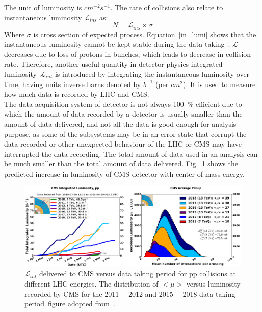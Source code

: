 The unit of luminosity is $cm^{-2}s^{-1}$. The rate of collisions also relate to instantaneous luminosity $\mathcal{L}_{ins}$ as:
\begin{equation}\label{in_lumi}
N=\mathcal{L}_{ins}\times\sigma
\end{equation}
Where $\sigma$ is cross section of expected process. Equation~\ref{in_lumi} shows that the instantaneous luminosity cannot be kept stable during the data taking~\cite{Waqas:2779481}. $\mathcal{L}$ decreases due to loss of protons in bunches, which leads to decrease in collision rate. Therefore, another useful quantity in detector physics integrated luminosity~$\mathcal{L}_{int}$ is introduced by integrating the instantaneous luminosity over time, having units inverse barns denoted by $b^{-1}$ (per $cm^{2}$). It is used to measure how much data is recorded by LHC and CMS.\\
The data acquisition system  of detector is not always 100~$\%$ efficient due to which the amount of data recorded by a detector is usually smaller than the amount of data delivered, and not all the data is good enough for analysis purpose, as some of the subsystems may be in an error state that corrupt the data recorded or other unexpected behaviour of the LHC or CMS may have interrupted the data recording. The total amount of data used in an analysis can be much smaller than the total amount of data delivered. Fig.~\ref{CMS_lumi} shows the predicted increase in luminosity of CMS detector with center of mass energy.
\begin{figure}[H]
\centering
\includegraphics[scale=1]{chapter2/cms-lumi.png}
\caption{$\mathcal{L}_{int}$ delivered to CMS versus data taking period for pp collisions at different LHC energies. The distribution of $<\mu>$ versus luminosity recorded by CMS for the 2011~-~2012 and 2015~-~2018 data taking period~figure adopted from~\cite{Aberle:2749422}. }
\label{CMS_lumi}
\end{figure}
